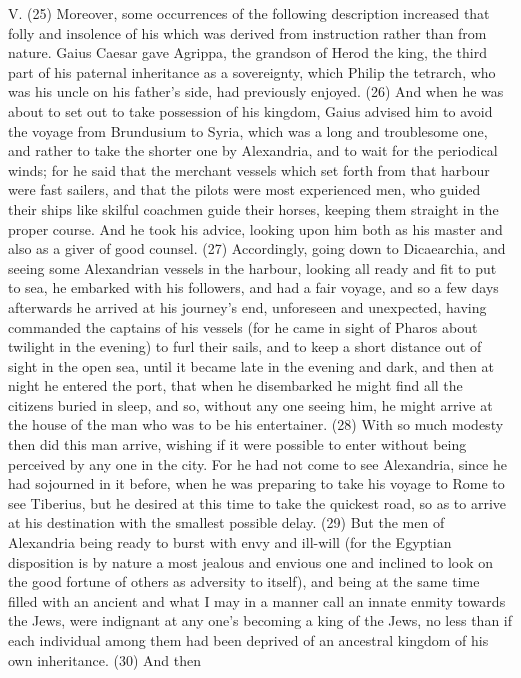 V. (25) Moreover, some occurrences of the following description increased that folly and insolence
of his which was derived from instruction rather than from nature. Gaius Caesar gave Agrippa, the
grandson of Herod the king, the third part of his paternal inheritance as a sovereignty, which Philip
the tetrarch, who was his uncle on his father's side, had previously enjoyed. (26) And when he was
about to set out to take possession of his kingdom, Gaius advised him to avoid the voyage from
Brundusium to Syria, which was a long and troublesome one, and rather to take the shorter one by
Alexandria, and to wait for the periodical winds; for he said that the merchant vessels which set
forth from that harbour were fast sailers, and that the pilots were most experienced men, who
guided their ships like skilful coachmen guide their horses, keeping them straight in the proper
course. And he took his advice, looking upon him both as his master and also as a giver of good
counsel. (27) Accordingly, going down to Dicaearchia, and seeing some Alexandrian vessels in the
harbour, looking all ready and fit to put to sea, he embarked with his followers, and had a fair
voyage, and so a few days afterwards he arrived at his journey's end, unforeseen and unexpected,
having commanded the captains of his vessels (for he came in sight of Pharos about twilight in the
evening) to furl their sails, and to keep a short distance out of sight in the open sea, until it became
late in the evening and dark, and then at night he entered the port, that when he disembarked he
might find all the citizens buried in sleep, and so, without any one seeing him, he might arrive at the
house of the man who was to be his entertainer. (28) With so much modesty then did this man
arrive, wishing if it were possible to enter without being perceived by any one in the city. For he had
not come to see Alexandria, since he had sojourned in it before, when he was preparing to take his
voyage to Rome to see Tiberius, but he desired at this time to take the quickest road, so as to
arrive at his destination with the smallest possible delay. (29) But the men of Alexandria being
ready to burst with envy and ill-will (for the Egyptian disposition is by nature a most jealous and
envious one and inclined to look on the good fortune of others as adversity to itself), and being at
the same time filled with an ancient and what I may in a manner call an innate enmity towards the
Jews, were indignant at any one's becoming a king of the Jews, no less than if each individual
among them had been deprived of an ancestral kingdom of his own inheritance. (30) And then
